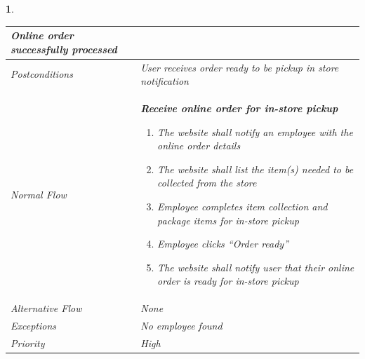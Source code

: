 \documentclass{scrreprt}
\theoremstyle{funreq}
\newtheorem{funreq}{}
\begin{document}
\begin{funreq}
\begin{table}[H]
{\begin{tabularx}{\columnwidth}{|l|X|}
					Online order successfully processed
					\\ \hline Postconditions   & 
					User receives order ready to be pickup in store notification
					\\ \hline Normal Flow &
					\bfseries{Receive online order for in-store pickup}\normalfont\newline 
					\begin{enumerate}
					    \item The website shall notify an employee with the online order details
					    \item The website shall list the item(s) needed to be collected from the store
                        \item Employee completes item collection and package items for in-store pickup
                        \item Employee clicks “Order ready”
                        \item The website shall notify user that their online order is ready for in-store pickup
					\end{enumerate}
					\\ \hline Alternative Flow & 
					None
					\\ \hline Exceptions & 
					No employee found
					\\ \hline Priority & 
					High
					\\ \hline
				\end{tabularx}%
			}
		\end{table}
	\end{funreq}

	
	
\end{document}

